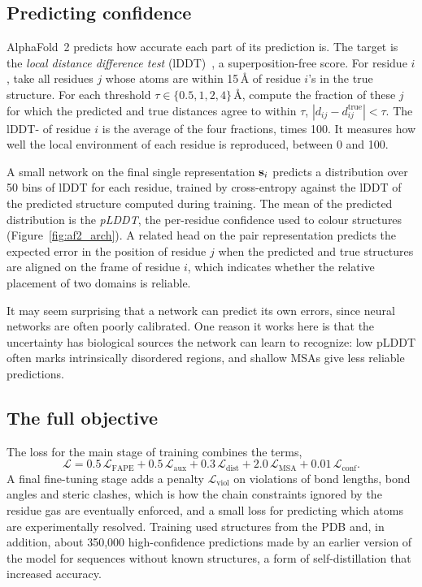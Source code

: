 \subsection{Predicting confidence}

AlphaFold~2 predicts how accurate each part of its prediction is. The target is the \emph{local distance difference test} (lDDT)~\citep{mariani2013}, a superposition-free score. For residue $i$, take all residues $j$ whose \Ca{} atoms are within 15\,\AA{} of residue $i$'s in the true structure. For each threshold $\tau\in\{0.5,1,2,4\}$\,\AA, compute the fraction of these $j$ for which the predicted and true distances agree to within $\tau$, $|d_{ij}-d^{\text{true}}_{ij}|<\tau$. The lDDT-\Ca{} of residue $i$ is the average of the four fractions, times 100. It measures how well the local environment of each residue is reproduced, between 0 and 100.

A small network on the final single representation $\mathbf{s}_i$ predicts a distribution over 50 bins of lDDT for each residue, trained by cross-entropy against the lDDT of the predicted structure computed during training. The mean of the predicted distribution is the \emph{pLDDT}, the per-residue confidence used to colour structures (Figure~\ref{fig:af2_arch}). A related head on the pair representation predicts the expected error in the position of residue $j$ when the predicted and true structures are aligned on the frame of residue $i$, which indicates whether the relative placement of two domains is reliable.

It may seem surprising that a network can predict its own errors, since neural networks are often poorly calibrated. One reason it works here is that the uncertainty has biological sources the network can learn to recognize: low pLDDT often marks intrinsically disordered regions, and shallow MSAs give less reliable predictions.

\subsection{The full objective}

The loss for the main stage of training combines the terms,
\begin{equation}
  \mathcal{L} = 0.5\,\mathcal{L}_{\text{FAPE}} + 0.5\,\mathcal{L}_{\text{aux}} + 0.3\,\mathcal{L}_{\text{dist}} + 2.0\,\mathcal{L}_{\text{MSA}} + 0.01\,\mathcal{L}_{\text{conf}} .
  \label{eq:full_loss}
\end{equation}
A final fine-tuning stage adds a penalty $\mathcal{L}_{\text{viol}}$ on violations of bond lengths, bond angles and steric clashes, which is how the chain constraints ignored by the residue gas are eventually enforced, and a small loss for predicting which atoms are experimentally resolved. Training used structures from the PDB and, in addition, about 350,000 high-confidence predictions made by an earlier version of the model for sequences without known structures, a form of self-distillation that increased accuracy.

